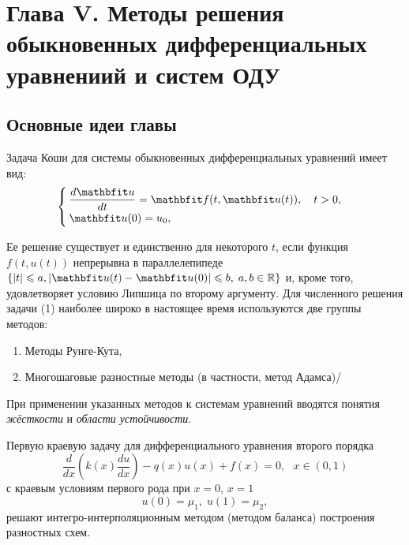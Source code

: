 \newpage
{}
\pagestyle{empty}
\vspace{0.5cm}

\section*{Глава V. Методы решения обыкновенных дифференциальных уравнениий и систем ОДУ}

\subsection{Основные идеи главы} 

Задача Коши для системы обыкновенных дифференциальных уравнений имеет вид:
\begin{equation}
%
    \label{Koshi_sys}
    \begin{cases}
        \dfrac{d\vfunc{u}}{dt} = \vfunc{f}(t, \vfunc{u}(t)), \quad t > 0, \\
        \vfunc{u}(0) = u_0,
    \end{cases}
\end{equation}

Ее решение существует и единственно для некоторого $t$, если функция $f(t, u(t))$ непрерывна в параллелепипеде $\{|t| \leqslant a, | \vfunc{u}(t)-\vfunc{u}(0)| \leqslant b,\; a, b\in\mathbb{R}\}$ и, кроме того, удовлетворяет условию Липшица по второму аргументу. Для численного решения задачи (1) наиболее широко в настоящее время используются две группы методов: 
\begin{enumerate}
\item Методы Рунге-Кута,
\item Многошаговые разностные методы (в частности, метод Адамса)/
\end{enumerate}

При применении указанных методов к системам уравнений вводятся понятия \textit{жёсткости} и \textit{области устойчивости}.
 
Первую краевую задачу для дифференциального уравнения второго порядка
\begin{equation}
    \label{eq:2-ord-eq}
    \dfrac{d}{dx}\left(k(x)\dfrac{du}{dx}\right) - q(x)u(x) + f(x) = 0, ~~~x\in(0,1)
\end{equation}
%
с краевым условиям первого рода при $x=0$, $x=1$
%
\begin{equation}
    \label{eq:2-ord-eq-bounds}
    u(0) = \mu_1,\;u(1) = \mu_2,
\end{equation}
%
решают интегро-интерполяционным методом (методом баланса) построения разностных схем.

